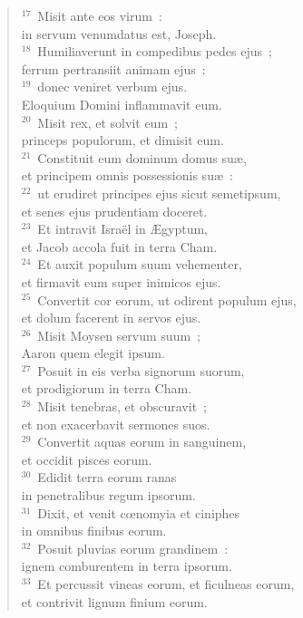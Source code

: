\begin{verse}
${}^{17}$~Misit ante eos virum~:\\ in servum venumdatus est, Joseph.\\
${}^{18}$~Humiliaverunt in compedibus pedes ejus~;\\ ferrum pertransiit animam ejus~:\\
${}^{19}$~donec veniret verbum ejus.\\ Eloquium Domini inflammavit eum.\\
${}^{20}$~Misit rex, et solvit eum~;\\ princeps populorum, et dimisit eum.\\
${}^{21}$~Constituit eum dominum domus su\ae ,\\ et principem omnis possessionis su\ae~:\\
${}^{22}$~ut erudiret principes ejus sicut semetipsum,\\ et senes ejus prudentiam doceret.\\
${}^{23}$~Et intravit Isra\"el in \AE gyptum,\\ et Jacob accola fuit in terra Cham.\\
${}^{24}$~Et auxit populum suum vehementer,\\ et firmavit eum super inimicos ejus.\\
${}^{25}$~Convertit cor eorum, ut odirent populum ejus,\\ et dolum facerent in servos ejus.\\
${}^{26}$~Misit Moysen servum suum~;\\ Aaron quem elegit ipsum.\\
${}^{27}$~Posuit in eis verba signorum suorum,\\ et prodigiorum in terra Cham.\\
${}^{28}$~Misit tenebras, et obscuravit~;\\ et non exacerbavit sermones suos.\\
${}^{29}$~Convertit aquas eorum in sanguinem,\\ et occidit pisces eorum.\\
${}^{30}$~Edidit terra eorum ranas\\ in penetralibus regum ipsorum.\\
${}^{31}$~Dixit, et venit cœnomyia et ciniphes\\ in omnibus finibus eorum.\\
${}^{32}$~Posuit pluvias eorum grandinem~:\\ ignem comburentem in terra ipsorum.\\
${}^{33}$~Et percussit vineas eorum, et ficulneas eorum,\\ et contrivit lignum finium eorum.\\

\end{verse}
